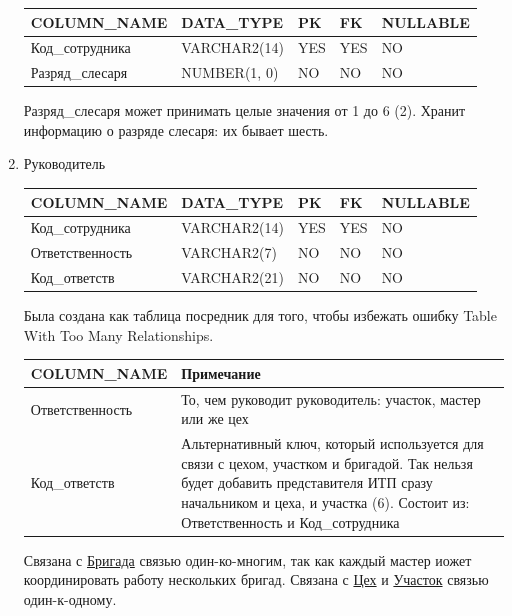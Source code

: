 \begin{enumerate}
\begin{tabular}{|p{7cm}|p{3cm}|p{1cm}|p{1cm}|p{3cm}|}
        {\bf COLUMN\_NAME} & {\bf DATA\_TYPE} & {\bf PK} & {\bf FK} & {\bf NULLABLE} \\ \hline
        Код\_сотрудника & VARCHAR2(14) & YES & YES & NO \\ \hline
        Разряд\_слесаря & NUMBER(1, 0) & NO & NO & NO \\ \hline

    \end{tabular}

    Разряд\_слесаря может принимать целые значения от 1 до 6 (2).
    Хранит информацию о разряде слесаря: их бывает шесть.

    \item{Руководитель}

    \begin{tabular}{|p{7cm}|p{3cm}|p{1cm}|p{1cm}|p{3cm}|} \hline

        {\bf COLUMN\_NAME} & {\bf DATA\_TYPE} & {\bf PK} & {\bf FK} & {\bf NULLABLE} \\ \hline
        Код\_сотрудника & VARCHAR2(14) & YES & YES & NO \\ \hline
        Ответственность & VARCHAR2(7) & NO & NO & NO \\ \hline
        Код\_ответств & VARCHAR2(21) & NO & NO & NO \\ \hline

    \end{tabular}

    Была создана как таблица посредник для того, чтобы избежать ошибку Table With Too Many Relationships.

    \begin{tabular}{|p{7cm}|p{9.3cm}|} \hline

        {\bf COLUMN\_NAME} & {\bf Примечание} \\ \hline
        Ответственность & То, чем руководит руководитель: участок, мастер или же цех  \\ \hline
        Код\_ответств & Альтернативный ключ, который используется для связи с цехом, участком и бригадой. Так нельзя будет добавить представителя ИТП сразу начальником и цеха, и участка (6). Состоит из: Ответственность и Код\_сотрудника \\ \hline
    \end{tabular}

    Связана с \underline{Бригада} связью один-ко-многим, так как каждый мастер иожет координировать работу нескольких бригад.
    Связана с \underline{Цех} и \underline{Участок} связью один-к-одному.


\end{enumerate}
